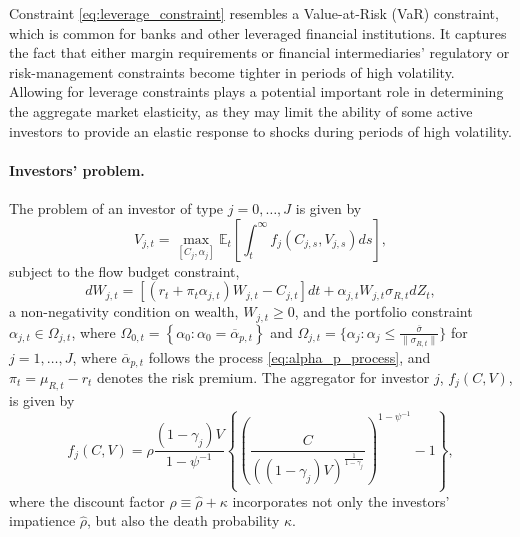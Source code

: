 Constraint \eqref{eq:leverage_constraint} resembles a Value-at-Risk (VaR) constraint, which is common for banks and other leveraged financial institutions.
It captures the fact that either margin requirements or financial intermediaries' regulatory or risk-management constraints become tighter in periods of high volatility. 
Allowing for leverage constraints plays a potential important role in determining the aggregate market elasticity, as they may limit the ability of some active investors to provide an elastic response to shocks during periods of high volatility. 

\paragraph{Investors' problem.}  The problem of an investor of type $j = 0, \ldots, J$ is given by
\begin{equation}\label{eq:inv-problem}
    V_{j,t} = \max_{[C_j,\alpha_j]} \mathbb{E}_t\left[ \int_t^\infty f_j(C_{j,s},V_{j,s}) ds \right], 
\end{equation}
subject to the flow budget constraint, 
\begin{equation}
    d W_{j,t} = \left[ (r_t  + \pi_t \alpha_{j,t}) W_{j,t} - C_{j,t} \right] dt + \alpha_{j,t} W_{j,t} \sigma_{R,t} d Z_{t},
\end{equation}
a non-negativity condition on wealth, $W_{j,t} \geq 0$, and the portfolio constraint $\alpha_{j,t} \in \Omega_{j,t}$, where $\Omega_{0,t} = \left\lbrace\alpha_0: \alpha_0 = \overline{\alpha}_{p,t}\right\rbrace $ and $\Omega_{j,t} = \{\alpha_j: \alpha_j \leq \frac{\overline{\sigma}}{\|\sigma_{R,t}\|} \}$ for $j = 1,\ldots, J$, where $\overline{\alpha}_{p,t}$ follows the process \eqref{eq:alpha_p_process}, and $\pi_t = \mu_{R,t}-r_t$ denotes the risk premium. The aggregator for investor $j$, $f_j(C,V)$, is given by
\begin{equation}
    f_j(C,V) = \rho \frac{(1-\gamma_j) V}{1-\psi^{-1}} \left\{ \left( \frac{C}{\left( (1-\gamma_j) V \right)^{\frac{1}{1-\gamma_j}}} \right)^{1-\psi^{-1}} -1 \right\},
\end{equation}
where the discount factor $\rho \equiv \hat{\rho}+\kappa$ incorporates not only the investors' impatience $\hat{\rho}$, but also the death probability $\kappa$.

